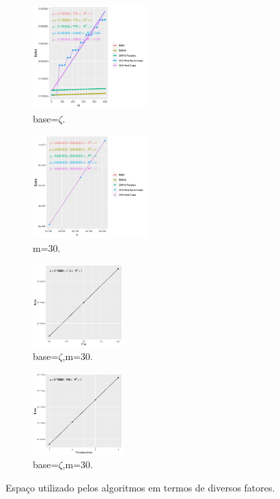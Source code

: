 \documentclass[11pt]{article}
\begin{document}
\begin{center}
\begin{figure}
\begin{subfigure}[b]{.49\linewidth}
\centering
\caption{base=$\zeta$.}\label{fig:mxbytes}
\includegraphics[width=4.4cm]{mxbytes}
\end{subfigure}
\begin{subfigure}[b]{.49\linewidth}
\centering
\caption{m=30.}\label{fig:nxbytes}
\includegraphics[width=4.4cm]{nxbytes}
\end{subfigure}
\begin{subfigure}[b]{.49\linewidth}
\centering
\caption{base=$\zeta$,m=30.}\label{fig:errorxbytes}
\includegraphics[width=3.5cm]{errorxbytes}
\end{subfigure}
\begin{subfigure}[b]{.49\linewidth}
\centering
\caption{base=$\zeta$,m=30.}\label{fig:pxbytes}
\includegraphics[width=3.5cm]{pxbytes}
\end{subfigure}
\caption{Espaço utilizado pelos algoritmos em termos de diversos fatores.}
\end{figure}
\end{center}
\end{document}
